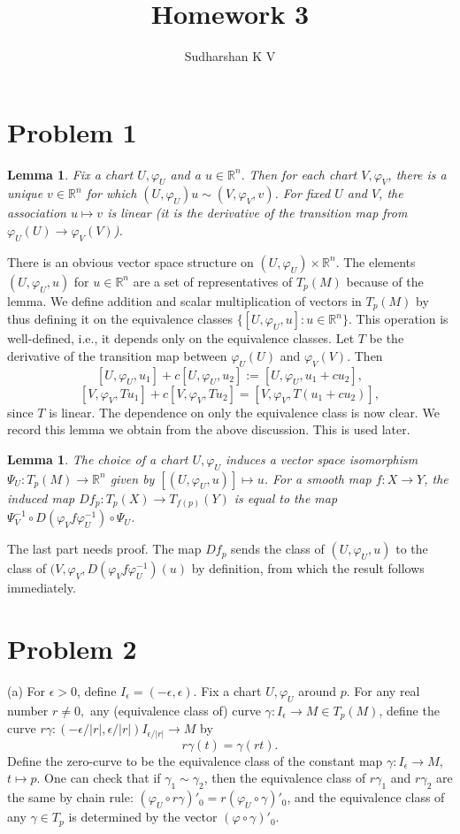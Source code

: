 \documentclass{amsart}
\title{Homework 3}
\author{Sudharshan K V}
\numberwithin{equation}{section}
\theoremstyle{plain}
\newtheorem{lemma}[theorem]{Lemma}
\theoremstyle{definition}
\theoremstyle{remark}
\renewcommand{\_}[2]{\underbrace{#1}_{#2}}
\renewcommand{\^}[2]{\overbrace{#1}_{#2}}
\newcommand{\R}{\mathbb{R}}
\begin{document}
\maketitle

\section*{Problem 1}
\begin{lemma}
  Fix a chart $U, \varphi_U$ and a $u\in \R^n.$ Then for each chart $V,\varphi_V$, there is a unique $v\in \R^n$ for which $(U,\varphi_U) u \sim (V, \varphi_V, v)$. For fixed $U$ and $V$, the association $u\mapsto v$ is linear (it is the derivative of the transition map from $\varphi_U(U) \to \varphi_V(V)$).
\end{lemma}
There is an obvious vector space structure on $(U, \varphi_U) \times \R^n$. The elements $(U,\varphi_U, u)$ for $u\in \R^n$ are a set of representatives of $T_p(M)$ because of the lemma. We define addition and scalar multiplication of vectors in $T_p(M)$ by thus defining it on the equivalence classes $\{[U, \varphi_U, u]: u\in \R^n\}.$ This operation is well-defined, i.e., it depends only on the equivalence classes. Let $T$ be the derivative of the transition map between $\varphi_U(U)$ and $\varphi_V(V)$. Then \[[U, \varphi_U, u_1] + c[U, \varphi_U, u_2] := [U,\varphi_U, u_1+cu_2],\] \[[V,\varphi_V, Tu_1] + c[V, \varphi_V, Tu_2] = [V, \varphi_V, T(u_1 + cu_2)],\] since $T$ is linear. The dependence on only the equivalence class is now clear. We record this lemma we obtain from the above discussion. This is used later.

\begin{lemma}
  The choice of a chart $U, \varphi_U$ induces a vector space isomorphism $\Psi_U: T_p(M) \to \R^n$ given by $[(U, \varphi_U, u)] \mapsto u$. For a smooth map $f: X\to Y$, the induced map $Df_p: T_p(X) \to T_{f(p)}(Y)$ is equal to the map $\Psi_V^{-1}\circ D(\varphi_Vf\varphi_U^{-1})\circ\Psi_U$.
\end{lemma}
The last part needs proof. The map $Df_p$ sends the class of $(U, \varphi_U, u)$ to the class of $(V, \varphi_V, D(\varphi_Vf\varphi_U^{-1}) (u)$ by definition, from which the result follows immediately.

\section*{Problem 2}
(a) For $\epsilon > 0$, define $I_\epsilon = (-\epsilon, \epsilon)$. Fix a chart $U, \varphi_U$ around $p$. For any real number $r\neq 0,$ any (equivalence class of) curve $\gamma: I_\epsilon \to M \in T_p(M)$, define the curve $r\gamma: (-\epsilon/|r|, \epsilon/|r|)I_{\epsilon/|r|} \to M$ by \[r\gamma(t) = \gamma(rt).\] Define the zero-curve to be the equivalence class of the constant map $\gamma: I_\epsilon \to M$, $t\mapsto p$. One can check that if $\gamma_1 \sim \gamma_2$, then the equivalence class of $r\gamma_1$ and $r\gamma_2$ are the same by chain rule: $(\varphi_U \circ r\gamma)'_0 = r (\varphi_U\circ \gamma)'_0$, and the equivalence class of any $\gamma \in T_p$ is determined by the vector $(\varphi \circ \gamma)'_0$.\\
\end{document}
